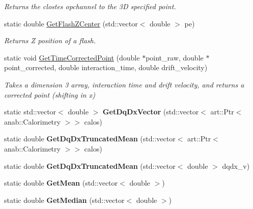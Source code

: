 \begin{DoxyCompactItemize}
\begin{DoxyCompactList}\small\item\em Returns the clostes opchannel to the 3\-D specified point. \end{DoxyCompactList}\item 
static double \hyperlink{classUBXSecHelper_a3fd25ef568b54aded55d6c1b6a8593fa}{Get\-Flash\-Z\-Center} (std\-::vector$<$ double $>$ pe)
\begin{DoxyCompactList}\small\item\em Returns Z position of a flash. \end{DoxyCompactList}\item 
static void \hyperlink{classUBXSecHelper_a44a38546ab8f9a473f0957af008219d4}{Get\-Time\-Corrected\-Point} (double $\ast$point\-\_\-raw, double $\ast$point\-\_\-corrected, double interaction\-\_\-time, double drift\-\_\-velocity)
\begin{DoxyCompactList}\small\item\em Takes a dimension 3 array, interaction time and drift velocity, and returns a corrected point (shifting in x) \end{DoxyCompactList}\item 
\hypertarget{classUBXSecHelper_a95bf66cb161fe3c0fccdfef70c866f9c}{static std\-::vector$<$ double $>$ {\bfseries Get\-Dq\-Dx\-Vector} (std\-::vector$<$ art\-::\-Ptr$<$ anab\-::\-Calorimetry $>$$>$ calos)}\label{classUBXSecHelper_a95bf66cb161fe3c0fccdfef70c866f9c}

\item 
\hypertarget{classUBXSecHelper_a1510ec3db42854ce3b6fb6c70b3bdb59}{static double {\bfseries Get\-Dq\-Dx\-Truncated\-Mean} (std\-::vector$<$ art\-::\-Ptr$<$ anab\-::\-Calorimetry $>$$>$ calos)}\label{classUBXSecHelper_a1510ec3db42854ce3b6fb6c70b3bdb59}

\item 
\hypertarget{classUBXSecHelper_a18cdf8228d1a98d4fa953423b8de114c}{static double {\bfseries Get\-Dq\-Dx\-Truncated\-Mean} (std\-::vector$<$ double $>$ dqdx\-\_\-v)}\label{classUBXSecHelper_a18cdf8228d1a98d4fa953423b8de114c}

\item 
\hypertarget{classUBXSecHelper_a7b30d498de5b4468a717f6223e6d43a0}{static double {\bfseries Get\-Mean} (std\-::vector$<$ double $>$)}\label{classUBXSecHelper_a7b30d498de5b4468a717f6223e6d43a0}

\item 
\hypertarget{classUBXSecHelper_a69277b565e667891e4fe820f7beca6cf}{static double {\bfseries Get\-Median} (std\-::vector$<$ double $>$)}\label{classUBXSecHelper_a69277b565e667891e4fe820f7beca6cf}


\end{DoxyCompactItemize}
